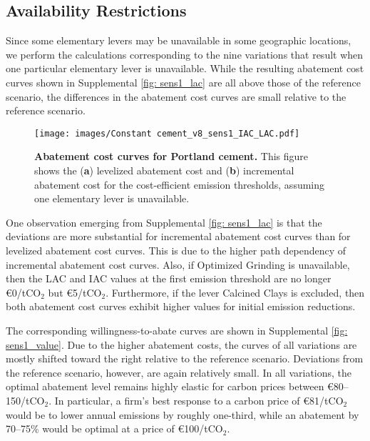 \documentclass[12pt, a4paper]{article} %
\newcommand{\Suppl}{Supplemental}
\begin{document}
\newpage
\subsection{Availability Restrictions}
\label{sec: sn-restrictions}

Since some elementary levers may be unavailable in some geographic locations, we perform the calculations corresponding to the nine variations that result when one particular elementary lever is unavailable. While the resulting abatement cost curves shown in \Suppl$ $ \autoref{fig: sens1_lac} are all above those of the reference scenario, the differences in the abatement cost curves are small relative to the reference scenario.

\begin{figure}[ht]
\centering
\texttt{[image: images/Constant cement\_v8\_sens1\_IAC\_LAC.pdf]}
\caption{\textbf{Abatement cost curves for Portland cement.} This figure shows the (\textbf{a}) levelized abatement cost and (\textbf{b}) incremental abatement cost for the cost-efficient emission thresholds, assuming one elementary lever is unavailable.}
\label{fig: sens1_lac}
\end{figure}

One observation emerging from \Suppl$ $ \autoref{fig: sens1_lac} is that the deviations are more substantial for incremental abatement cost curves than for levelized abatement cost curves. This is due to the higher path dependency of incremental abatement cost curves. Also, if Optimized Grinding is unavailable, then the LAC and IAC values at the first emission threshold are no longer \euro 0/tCO$_2$ but \euro 5/tCO$_2$. Furthermore, if the lever Calcined Clays is excluded, then both abatement cost curves exhibit higher values for initial emission reductions.

\newpage
The corresponding willingness-to-abate curves are shown in \Suppl$ $ \autoref{fig: sens1_value}. Due to the higher abatement costs, the curves of all variations are mostly shifted toward the right relative to the reference scenario. Deviations from the reference scenario, however, are again relatively small. In all variations, the optimal abatement level remains highly elastic for carbon prices between \euro 80--150/tCO$_2$. In particular, a firm's best response to a carbon price of \euro 81/tCO$_2$ would be to lower annual emissions by roughly one-third, while an abatement by 70--75\% would be optimal at a price of \euro 100/tCO$_2$.
\end{document}
